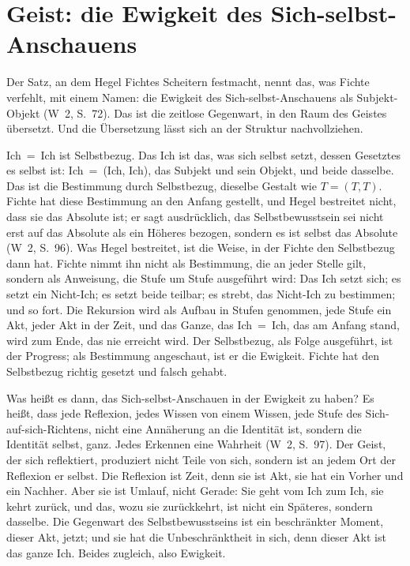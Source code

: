 \documentclass[11pt,a4paper]{article}
\newcommand{\SO}{Subjekt-Objekt}
\newcommand{\Werke}[1]{(W~2, S.~#1)}
\begin{document}
\section{Geist: die Ewigkeit des Sich-selbst-Anschauens}

Der Satz, an dem Hegel Fichtes Scheitern festmacht, nennt das, was Fichte verfehlt, mit einem Namen: die \glqq Ewigkeit des Sich-selbst-Anschauens als \SO{}\grqq{} \Werke{72}. Das ist die zeitlose Gegenwart, in den Raum des Geistes übersetzt. Und die Übersetzung lässt sich an der Struktur nachvollziehen.

Ich~=~Ich ist Selbstbezug. Das Ich ist das, was sich selbst setzt, dessen Gesetztes es selbst ist: Ich~=~(Ich, Ich), das Subjekt und sein Objekt, und beide dasselbe. Das ist die Bestimmung durch Selbstbezug, dieselbe Gestalt wie $T = (T, T)$. Fichte hat diese Bestimmung an den Anfang gestellt, und Hegel bestreitet nicht, dass sie das Absolute ist; er sagt ausdrücklich, das Selbstbewusstsein sei \glqq nicht erst auf das Absolute als ein Höheres bezogen, sondern es ist selbst das Absolute\grqq{} \Werke{96}. Was Hegel bestreitet, ist die Weise, in der Fichte den Selbstbezug dann hat. Fichte nimmt ihn nicht als Bestimmung, die an jeder Stelle gilt, sondern als Anweisung, die Stufe um Stufe ausgeführt wird: Das Ich setzt sich; es setzt ein Nicht-Ich; es setzt beide teilbar; es strebt, das Nicht-Ich zu bestimmen; und so fort. Die Rekursion wird als Aufbau in Stufen genommen, jede Stufe ein Akt, jeder Akt in der Zeit, und das Ganze, das Ich~=~Ich, das am Anfang stand, wird zum Ende, das nie erreicht wird. Der Selbstbezug, als Folge ausgeführt, ist der Progress; als Bestimmung angeschaut, ist er die Ewigkeit. Fichte hat den Selbstbezug richtig gesetzt und falsch gehabt.

Was heißt es dann, das Sich-selbst-Anschauen in der Ewigkeit zu haben? Es heißt, dass jede Reflexion, jedes Wissen von einem Wissen, jede Stufe des Sich-auf-sich-Richtens, nicht eine Annäherung an die Identität ist, sondern die Identität selbst, ganz. \glqq Jedes Erkennen eine Wahrheit\grqq{} \Werke{97}. Der Geist, der sich reflektiert, produziert nicht Teile von sich, sondern ist an jedem Ort der Reflexion er selbst. Die Reflexion ist Zeit, denn sie ist Akt, sie hat ein Vorher und ein Nachher. Aber sie ist Umlauf, nicht Gerade: Sie geht vom Ich zum Ich, sie kehrt zurück, und das, wozu sie zurückkehrt, ist nicht ein Späteres, sondern dasselbe. Die Gegenwart des Selbstbewusstseins ist ein beschränkter Moment, dieser Akt, jetzt; und sie hat die Unbeschränktheit in sich, denn dieser Akt ist das ganze Ich. Beides zugleich, also Ewigkeit.
\end{document}
